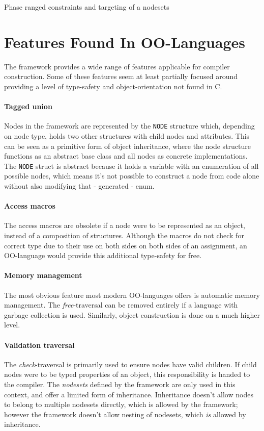 \documentclass[twoside,openright]{uva-bachelor-thesis}
\newcommand{\code}[1]{\texttt{\footnotesize#1}}
\begin{document}
			\begin{codebox}[label=c-targets]{Phase ranged constraints and targeting of a nodesets}
			\end{codebox}
		
		
	\section{Features Found In OO-Languages}
	\label{oofeatures}
		The framework provides a wide range of features applicable for compiler construction. Some of these features seem at least partially focused around providing a level of type-safety and object-orientation not found in C.
			
		\paragraph{Tagged union}
			Nodes in the framework are represented by the \code{NODE} structure which, depending on node type, holds two other structures with child nodes and attributes. This can be seen as a primitive form of object inheritance, where the node structure functions as an abstract base class and all nodes as concrete implementations. The \code{NODE} struct is abstract because it holds a variable with an enumeration of all possible nodes, which means it's not possible to construct a node from code alone without also modifying that - generated - enum.
			
		\paragraph{Access macros}
			The access macros are obsolete if a node were to be represented as an object, instead of a composition of structures. Although the macros do not check for correct type due to their use on both sides on both sides of an assignment, an OO-language would provide this additional type-safety for free.
			
		\paragraph{Memory management}
			The most obvious feature most modern OO-languages offers is automatic memory management. The \emph{free}-traversal can be removed entirely if a language with garbage collection is used. Similarly, object construction is done on a much higher level.
			
		\paragraph{Validation traversal}
			The \emph{check}-traversal is primarily used to ensure nodes have valid children. If child nodes were to be typed properties of an object, this responsibility is handed to the compiler. The \emph{nodesets} defined by the framework are only used in this context, and offer a limited form of inheritance. Inheritance doesn't allow nodes to belong to multiple nodesets directly, which is allowed by the framework; however the framework doesn't allow nesting of nodesets, which \emph{is} allowed by inheritance. 
			
\end{document}
